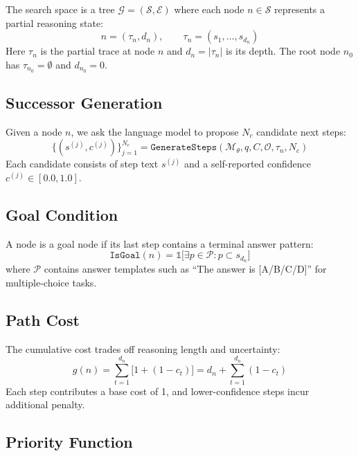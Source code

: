 The search space is a tree $\mathcal{G} = (\mathcal{S}, \mathcal{E})$ where each node $n \in \mathcal{S}$ represents a partial reasoning state:
\begin{equation}
n = (\tau_n, d_n), \qquad \tau_n = (s_1, \ldots, s_{d_n})
\end{equation}
Here $\tau_n$ is the partial trace at node $n$ and $d_n = |\tau_n|$ is its depth. The root node $n_0$ has $\tau_{n_0} = \emptyset$ and $d_{n_0} = 0$.

\subsection{Successor Generation}

Given a node $n$, we ask the language model to propose $N_c$ candidate next steps:
\begin{equation}
\{(s^{(j)}, c^{(j)})\}_{j=1}^{N_c} = \texttt{GenerateSteps}(\mathcal{M}_\theta, q, C, \mathcal{O}, \tau_n, N_c)
\end{equation}
Each candidate consists of step text $s^{(j)}$ and a self-reported confidence $c^{(j)} \in [0.0, 1.0]$.

\subsection{Goal Condition}

A node is a goal node if its last step contains a terminal answer pattern:
\begin{equation}
\texttt{IsGoal}(n) = \mathds{1}\Big[\exists p \in \mathcal{P}: p \subset s_{d_n}\Big]
\end{equation}
where $\mathcal{P}$ contains answer templates such as ``The answer is [A/B/C/D]'' for multiple-choice tasks.

\subsection{Path Cost}

The cumulative cost trades off reasoning length and uncertainty:
\begin{equation}
g(n) = \sum_{t=1}^{d_n} \big[1 + (1-c_t)\big] = d_n + \sum_{t=1}^{d_n}(1-c_t)
\end{equation}
Each step contributes a base cost of 1, and lower-confidence steps incur additional penalty.

\subsection{Priority Function}

